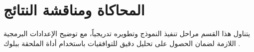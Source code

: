 
\section{المحاكاة ومناقشة النتائج} \label{part1:sec3}
  {\fontsize{16}{28}\selectfont
  يتناول هذا القسم مراحل تنفيذ النموذج وتطويره تدريجياً، مع توضيح الإعدادات البرمجية اللازمة لضمان الحصول على تحليل دقيق للتوافقيات باستخدام أداة  الملحقة ببلوك .
  \par}

  




